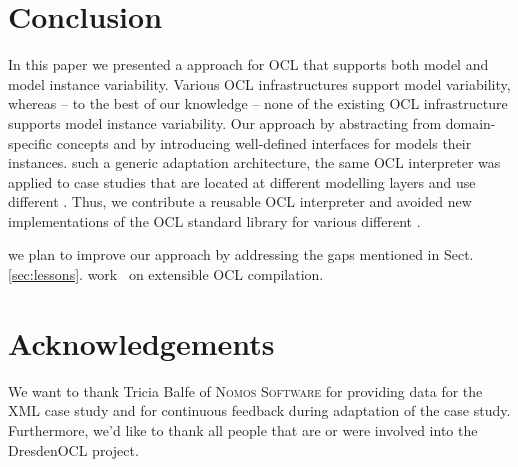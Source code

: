 \section{Conclusion}
\label{sec:conclusion}

In this paper we presented a  approach for  OCL
 that supports both model and
model instance variability. Various OCL infrastructures support 
model variability, whereas -- to the best of our knowledge -- none of 
the existing OCL infrastructure supports  model instance
variability. Our approach  by
abstracting from domain-specific concepts and by introducing well-defined interfaces for models
their instances.  such a
generic adaptation architecture, the same OCL interpreter was applied to
 case studies that are located at different modelling layers and
use different . Thus, we
 contribute a reusable OCL interpreter and
avoided new implementations of the OCL standard library for various different
. 

 we plan to improve our approach by addressing the gaps mentioned 
in Sect. \ref{sec:lessons}. 
work~\cite{OCLRelDB} on extensible OCL compilation.


\section{Acknowledgements}

We want to thank Tricia Balfe of \textsc{Nomos Software} for providing data for the XML case study and for continuous feedback during adaptation of the case study.
Furthermore, we'd like to thank all people that are or were involved into the DresdenOCL project.